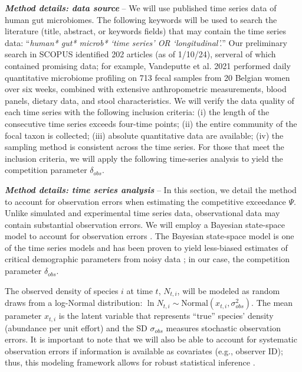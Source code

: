 \documentclass[12pt, class=article, crop=false]{standalone}
\begin{document}
\textit{\textbf{Method details: data source}} --
We will use published time series data of human gut microbiomes.
The following keywords will be used to search the literature (title, abstract, or keywords fields) that may contain the time series data: ``\textit{human* gut* microb* `time series' OR `longitudinal'.}''
Our preliminary search in SCOPUS identified 202 articles (as of 1/10/24), serveral of which contained promising data; for example, Vandeputte et al. 2021 \citep{vandeputte_temporal_2021} performed daily quantitative microbiome profiling on 713 fecal samples from 20 Belgian women over six weeks, combined with extensive anthropometric measurements, blood panels, dietary data, and stool characteristics. 
We will verify the data quality of each time series with the following inclusion criteria: (i) the length of the consecutive time series exceeds four-time points; (ii) the entire community of the focal taxon is collected; (iii) absolute quantitative data are available; (iv) the sampling method is consistent across the time series.
For those that meet the inclusion criteria, we will apply the following time-series analysis to yield the competition parameter $\delta_{obs}$.

\textit{\textbf{Method details: time series analysis}} --
In this section, we detail the method to account for observation errors when estimating the competitive exceedance $\Psi$.
Unlike simulated and experimental time series data, observational data may contain substantial observation errors.
We will employ a Bayesian state-space model to account for observation errors \citep{kery_bayesian_2012, amano_hierarchical_2012, anderson_black-swan_2017, terui_metapopulation_2018, terui_intentional_2023}.
The Bayesian state-space model is one of the time series models and has been proven to yield less-biased estimates of critical demographic parameters from noisy data \citep{kery_bayesian_2012}; in our case, the competition parameter $\delta_{obs}$.

The observed density of species $i$ at time $t$, $N_{t,i}$, will be modeled as random draws from a log-Normal distribution: $\ln N_{t,i} \sim \mbox{Normal}(x_{t,i}, \sigma_{obs}^2).$
The mean parameter $x_{t,i}$ is the latent variable that represents ``true'' species' density (abundance per unit effort) and the SD $\sigma_{obs}$ measures stochastic observation errors.
It is important to note that we will also be able to account for systematic observation errors if information is available as covariates (e.g., observer ID); thus, this modeling framework allows for robust statistical inference \citep{kery_bayesian_2012}.
\end{document}
